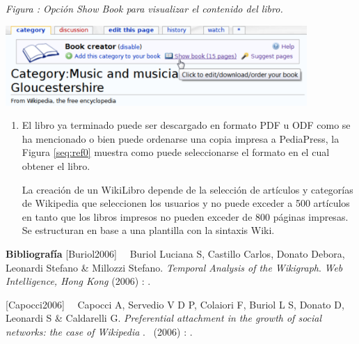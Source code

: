 \documentclass[letterpaper]{article}
\newcommand\textstylebibusindexbase[1]{#1}
\newcommand\textstylebibusindexbasei[1]{\textit{#1}}
\newcounter{saveenum}
\newcommand\liststyleLxxi{%
\renewcommand\theenumi{\arabic{enumi}}
\renewcommand\theenumii{\arabic{enumii}}
\renewcommand\theenumiii{\arabic{enumiii}}
\renewcommand\theenumiv{\arabic{enumiv}}
\renewcommand\labelenumi{\theenumi.}
\renewcommand\labelenumii{\theenumii.}
\renewcommand\labelenumiii{\theenumiii.}
\renewcommand\labelenumiv{\theenumiv.}
}
\newcounter{Figura}
\renewcommand\theFigura{\arabic{Figura}}
\begin{document}
\begin{center}
\begin{minipage}{13.231cm}
{\centering{}\itshape
Figura {\theFigura\label{seq:refFigura7}}:
Opci\'on Show Book para visualizar el contenido del libro.
\par}
\includegraphics[width=11.458cm,height=3.046cm]{Capitulo2-img15.png}\end{minipage}
\end{center}
\liststyleLxxi
\setcounter{saveenum}{\value{enumi}}
\begin{enumerate}
\setcounter{enumi}{\value{saveenum}}
\item[] 
\bigskip

{\sffamily
El libro ya terminado puede ser descargado en formato PDF u ODF como se
ha mencionado o bien puede ordenarse una copia impresa a PediaPress, la
Figura \ref{seq:ref0} muestra como puede seleccionarse el formato en el
cual obtener el libro.}


\bigskip

{\sffamily
La creaci\'on de un WikiLibro depende de la selecci\'on de art\'iculos y
categor\'ias de Wikipedia que seleccionen los usuarios y no puede
exceder a 500 art\'iculos en tanto que los libros impresos no pueden
exceder de 800 p\'aginas impresas. Se estructuran en base a una
plantilla con la sintaxis Wiki.}


\bigskip
\end{enumerate}
\clearpage
\bigskip

{\sffamily\bfseries
Bibliograf\'ia}
{
\textstylebibusindexbase{[Buriol2006]
}\ \ \textstylebibusindexbase{Buriol Luciana S, Castillo Carlos, Donato
Debora, Leonardi Stefano \& Millozzi Stefano.
}\textstylebibusindexbasei{Temporal Analysis of the
Wikigraph}\textstylebibusindexbase{. }\textstylebibusindexbasei{Web
Intelligence, Hong Kong}\textstylebibusindexbase{ (2006)
}\textstylebibusindexbase{: }\textstylebibusindexbase{.}}

{
\textstylebibusindexbase{[Capocci2006]
}\ \ \textstylebibusindexbase{Capocci A, Servedio V D P, Colaiori F,
Buriol L S, Donato D, Leonardi S \& Caldarelli G.
}\textstylebibusindexbasei{Preferential attachment in the growth of
social networks: the case of Wikipedia\newline
}\textstylebibusindexbase{.
}\textstylebibusindexbase{\ (}\textstylebibusindexbase{2006)
}\textstylebibusindexbase{: }\textstylebibusindexbase{.}}
\end{document}
